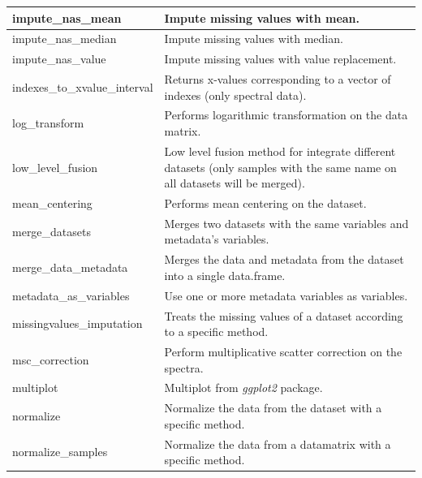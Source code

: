 \begin{scriptsize}
\begin{longtable}{|m{4.3cm}|m{11cm}|}
		\hline
		impute\_nas\_mean & Impute missing values with mean. \\
		
		\hline
		impute\_nas\_median & Impute missing values with median. \\
		
		\hline
		impute\_nas\_value & Impute missing values with value replacement. \\
		
		\hline
		indexes\_to\_xvalue\_interval & Returns x-values corresponding to a vector of indexes (only spectral data). \\
		
		\hline
		log\_transform & Performs logarithmic transformation on the data matrix. \\
		
		\hline
		low\_level\_fusion & Low level fusion method for integrate different datasets (only samples with the same name on all
		datasets will be merged). \\
		
		\hline
		mean\_centering & Performs mean centering on the dataset. \\
		
		\hline
		merge\_datasets & Merges two datasets with the same variables and metadata’s variables. \\
		
		\hline
		merge\_data\_metadata & Merges the data and metadata from the dataset into a single data.frame. \\
		
		\hline
		metadata\_as\_variables & Use one or more metadata variables as variables. \\
		
		\hline
		missingvalues\_imputation & Treats the missing values of a dataset according to a specific method. \\
		
		\hline
		msc\_correction & Perform multiplicative scatter correction on the spectra. \\
		
		\hline
		multiplot & Multiplot from \textit{ggplot2} package. \\
		
		\hline
		normalize & Normalize the data from the dataset with a specific method. \\
		
		\hline
		normalize\_samples & Normalize the data from a datamatrix with a specific method. \\
		

\end{longtable}
\end{scriptsize}
